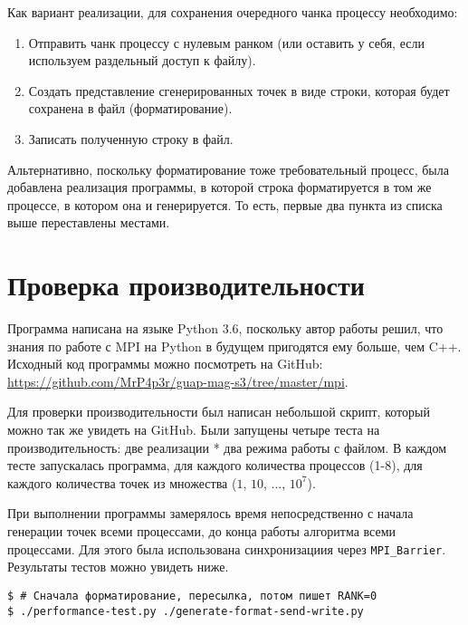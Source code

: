 \documentclass[12pt,a4paper]{article}
\begin{document}
Как вариант реализации, для сохранения очередного чанка процессу необходимо:

\begin{enumerate}
    \item Отправить чанк процессу с нулевым ранком (или оставить у себя, если используем раздельный доступ к файлу).
    \item Создать представление сгенерированных точек в виде строки, которая будет сохранена в файл (форматирование).
    \item Записать полученную строку в файл.
\end{enumerate}

Альтернативно, поскольку форматирование тоже требовательный процесс, была
добавлена реализация программы, в которой строка форматируется в том же процессе,
в котором она и генерируется. То есть, первые два пункта из списка выше
переставлены местами.


\section{Проверка производительности}

Программа написана на языке Python 3.6, поскольку автор работы решил, что
знания по работе с MPI на Python в будущем пригодятся ему больше, чем C++.
Исходный код программы можно посмотреть на GitHub: \\
\url{https://github.com/MrP4p3r/guap-mag-s3/tree/master/mpi}.

Для проверки производительности был написан небольшой скрипт, который
можно так же увидеть на GitHub. Были запущены четыре теста на производительность:
две реализации * два режима работы с файлом.
В каждом тесте запускалась программа, для каждого количества процессов (1-8),
для каждого количества точек из множества ($1$, $10$, ..., $10^7$). 

При выполнении программы замерялось время непосредственно с начала генерации
точек всеми процессами, до конца работы алгоритма всеми процессами. Для
этого была использована синхронизациия через \verb'MPI_Barrier'.
Результаты тестов можно увидеть ниже.

\newpage

\begin{Verbatim}
$ # Сначала форматирование, пересылка, потом пишет RANK=0
$ ./performance-test.py ./generate-format-send-write.py
\end{Verbatim}
\end{document}
